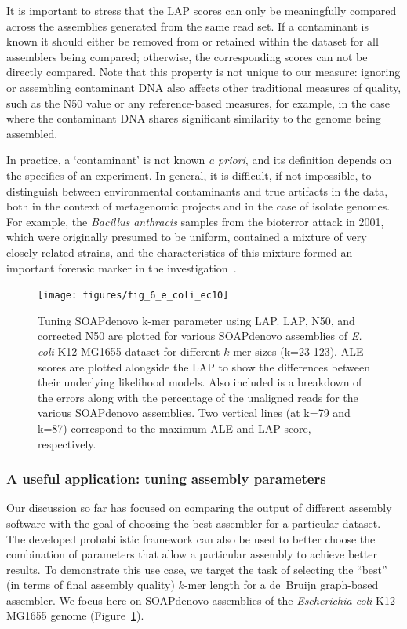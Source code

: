 \documentclass[12pt,\mydriver]{thesis}
\begin{document}
It is important to stress that the LAP
scores can only be meaningfully compared across the assemblies generated
from the same read set.  If a contaminant is known it should either be
removed from or retained within the dataset for all assemblers being
compared; otherwise, the corresponding scores can not be directly
compared. Note that this property is not unique to our measure:
ignoring or assembling contaminant DNA also affects other
traditional measures of quality, such as the N50 value or any
reference-based measures, for example, in the case where the contaminant DNA
shares significant similarity to the genome being assembled.

In practice, a `contaminant' is not known \emph{a
  priori}, and its definition depends on the specifics of an experiment.  In
general, it is difficult, if not impossible, to distinguish between
environmental contaminants and true artifacts in the data, both
in the context of metagenomic projects and in the case of
isolate genomes.  For example, the \emph{Bacillus anthracis} samples
from the bioterror attack in 2001, which were originally presumed to be uniform,
contained a mixture of very closely related strains, and the
characteristics of this mixture formed an important forensic marker in
the investigation~\cite{rasko2011bacillus}.

\begin{figure}[ht!]
\begin{center}
 \texttt{[image: figures/fig\_6\_e\_coli\_ec10]}
\end{center}
\renewcommand{\baselinestretch}{1}
\small\normalsize
\begin{quote}
\caption[Tuning SOAPdenovo k-mer parameter using LAP scores.]{Tuning SOAPdenovo k-mer parameter using LAP.
  LAP, N50, and corrected N50 are plotted for various SOAPdenovo assemblies of \emph{E. coli} K12 MG1655 dataset for different $k$-mer sizes (k=23-123). ALE~\cite{clark2013ale} scores are plotted alongside the LAP to show the differences between their underlying likelihood models.
  Also included is a breakdown of the errors along with the percentage of the unaligned reads for the various SOAPdenovo assemblies. Two vertical lines (at k=79 and k=87) correspond to the maximum ALE and LAP score, respectively.}
\label{fig:e_coli}
\end{quote}
\end{figure}
\renewcommand{\baselinestretch}{2}
\small\normalsize

\subsubsection{A useful application: tuning assembly parameters}
Our discussion so far has focused on comparing the output of different
assembly software with the goal of choosing the best assembler for a
particular dataset.  The developed probabilistic framework can
also be used to better choose the combination of parameters that allow
a particular assembly to achieve better results.  To demonstrate this
use case, we target the task of selecting the ``best'' (in terms of final assembly quality) $k$-mer length
for a de~Bruijn graph-based assembler.  We focus here on SOAPdenovo
assemblies of the \emph{Escherichia coli} K12 MG1655 genome (Figure~\ref{fig:e_coli}).
\end{document}
